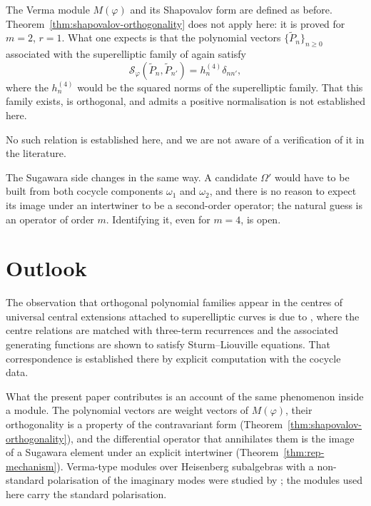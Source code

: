 \documentclass[12pt]{amsart}
\theoremstyle{plain}
\theoremstyle{definition}
\newcommand{\Mf}{M(\varphi)}          %
\newcommand{\Sf}{\mathcal{S}_\varphi} %
\newcommand{\Om}{\Omega}              %
\begin{document}
The Verma module $\Mf$ and its Shapovalov form are defined as before.
Theorem~\ref{thm:shapovalov-orthogonality} does not apply here: it is proved for
$m = 2$, $r = 1$. What one expects is that the polynomial vectors
$\{\tilde{P}_n\}_{n \geq 0}$ associated with the superelliptic family of
\cite{SantosNeklyudovFutorny2025} again satisfy
\[
  \Sf(\tilde{P}_n, \tilde{P}_{n'}) = h_n^{(4)} \delta_{n n'},
\]
where the $h_n^{(4)}$ would be the squared norms of the superelliptic
family. That this family exists, is orthogonal, and admits a positive
normalisation is not established here.

No such relation is established here, and we are not aware of a
verification of it in the literature.

The Sugawara side changes in the same way. A candidate $\Om'$ would
have to be built from both cocycle components $\omega_1$ and
$\omega_2$, and there is no reason to expect its image under an
intertwiner to be a second-order operator; the natural guess is an
operator of order $m$. Identifying it, even for $m = 4$, is open.

\section{Outlook}
\label{sec:outlook}

\label{subsec:connection-p1p3}

The observation that orthogonal polynomial families appear in the centres of
universal central extensions attached to superelliptic curves is due to
\cite{SantosNeklyudovFutorny2025}, where the centre relations are matched with
three-term recurrences and the associated generating functions are shown to
satisfy Sturm--Liouville equations. That correspondence is established there by
explicit computation with the cocycle data.

What the present paper contributes is an account of the same phenomenon inside a
module. The polynomial vectors are weight vectors of $\Mf$, their orthogonality
is a property of the contravariant form
(Theorem~\ref{thm:shapovalov-orthogonality}), and the differential operator that
annihilates them is the image of a Sugawara element under an explicit
intertwiner (Theorem~\ref{thm:rep-mechanism}). Verma-type modules over
Heisenberg subalgebras with a non-standard polarisation of the imaginary modes
were studied by \cite{BBFK2013}; the modules used here carry the standard
polarisation.
\end{document}
